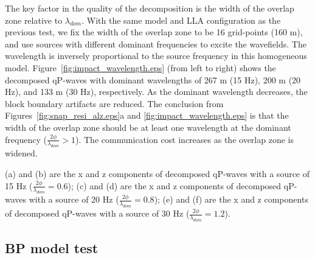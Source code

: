 \documentclass[manuscript,ulem,graphix,revised]{geophysics}
\begin{document}
The key factor in the quality of the decomposition is the width of the overlap zone relative to $\lambda_{dom}$. With the same model and LLA configuration as the previous test, we fix the width of the overlap zone to be 16 grid-points (160 m), and use sources with different dominant frequencies to excite the wavefields. 
The wavelength is inversely proportional to the source frequency in this homogeneous model. 
Figure~\ref{fig:impact_wavelength.eps} (from left to right) shows the decomposed qP-waves with dominant wavelengths of 267 m (15 Hz), 200 m (20 Hz), and 133 m (30 Hz), respectively. 
As the dominant wavelength decreases, the block boundary artifacts are reduced.
The conclusion from Figures~\ref{fig:snap_resi_alz.eps}a and \ref{fig:impact_wavelength.eps} is that the width of the overlap zone should be at least one wavelength at the dominant frequency ($\frac{2\phi}{\lambda_{dom}}>1$). The communication cost increases as the overlap zone is widened. 

 {
(a) and (b) are the x and z components of decomposed qP-waves with a source of 15 Hz ($\frac{2\phi}{\lambda_{dom}}=0.6$); 
(c) and (d) are the x and z components of decomposed qP-waves with a source of 20 Hz ($\frac{2\phi}{\lambda_{dom}}=0.8$); 
(e) and (f) are the x and z components of decomposed qP-waves with a source of 30 Hz ($\frac{2\phi}{\lambda_{dom}}=1.2$).
}

\subsection{BP model test}
\indent\indent
\end{document}
